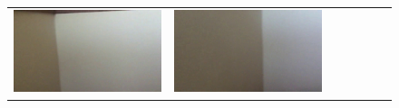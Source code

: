 \documentclass[letterpaper, 10 pt, conference]{ieeeconf}  %
\begin{document}
\begin{figure}
\begin{tabular*}{\textwidth}{ccccccc}
 \includegraphics[width=\imgW,height=\imgH]{rio-rf6} &
 \includegraphics[width=\imgW,height=\imgH]{rio-rf8} \\
 

\end{tabular*}
\end{figure}
\end{document}
